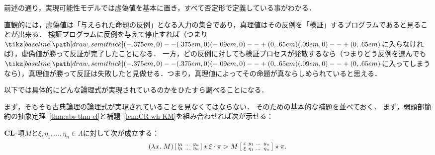 \documentclass[realisability.tex]{subfiles}
\begin{document}
前述の通り，実現可能性モデルでは虚偽値を基本に置き，すべて否定形で定義している事がわかる．

直観的には，虚偽値は「与えられた命題の反例」となる入力の集合であり，真理値はその反例を「検証」するプログラムであると見ることが出来る．
検証プログラムに反例を与えて停止すれば（つまり$\pole$に入らなければ），虚偽値が勝って反証が完了したことになる．
一方，どの反例に対しても検証プロセスが発散するなら（つまりどう反例を選んでも$\pole$に入ってしまうなら），真理値が勝って反証は失敗したと見做せる．つまり，真理値によってその命題が真ならしめられていると思える．

以下では具体的にどんな論理式が実現されているのかをひたすら調べることになる．

まず，そもそも古典論理の論理式が実現されていることを見なくてはならない．
そのための基本的な補題を並べておく．
まず，弱頭部簡約の抽象定理~\ref{thm:abs-thm-cl}と補題~\ref{lem:CR-wh-KM}を組み合わせれば次が示せる：
\begin{theorem}[抽象定理]\label{thm:abs-thm}
 $\mathord{\mathbf{CL}}$-項$M$と$\xi, \eta_1, \dots, \eta_n \in \Lambda$に対して次が成立する：
 \[
  (\lambda^{\mathsf{}}x.\;M)\left[\begin{smallmatrix}y_1 & \dots& y_n\\ \eta_1& \dots & \eta_n \end{smallmatrix}\right] \mathbin{\star} \xi \cdot \pi \mathrel{\rhd}
  M\left[\begin{smallmatrix}x & y_1 & \dots& y_n\\ \xi & \eta_1 & \dots &\eta_n \end{smallmatrix}\right] \mathbin{\star} \pi.
 \]
\end{theorem}
\end{document}
